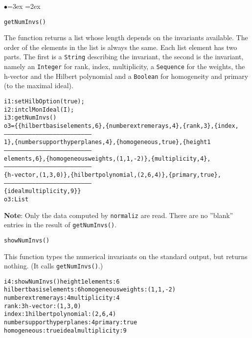 \documentclass[11pt]{amsart}
\newenvironment{example}
  {\begin{alltt}\small}
  {\end{alltt}}
\newenvironment{functions}
  {\begin{list}{$\bullet$}{\leftmargin=3ex \labelwidth=2ex
  \listparindent=0pt \itemsep=6pt \parsep=3pt}}
  {\end{list}}
\begin{document}
\begin{functions}

\item\verb+getNumInvs()+

The function returns a list whose length depends on the invariants
available. The order of the elements in the list is always the
same. Each list element has two parts. The first is a {\tt String}
describing the invariant, the second is the invariant, namely an
{\tt Integer} for rank, index, multiplicity, a {\tt Sequence} for
the weights, the h-vector and the Hilbert polynomial and a {\tt Boolean}
for homogeneity and primary (to the maximal ideal).

\begin{example}
i1 : setHilbOption(true);
i2 : intclMonIdeal(I);
i3 : getNumInvs()
o3 = \{\{hilbert basis elements, 6\}, \{number extreme rays, 4\}, \{rank, 3\}, \{index,
      --------------------------------------------------------------------------
      1\}, \{number support hyperplanes, 4\}, \{homogeneous, true\}, \{height 1
      --------------------------------------------------------------------------
      elements, 6\}, \{homogeneous weights, (1, 1, -2)\}, \{multiplicity, 4\},
      --------------------------------------------------------------------------
      \{h-vector, (1, 3, 0)\}, \{hilbert polynomial, (2, 6, 4)\}, \{primary, true\},
      --------------------------------------------------------------------------
      \{ideal multiplicity, 9\}\}
o3 : List
\end{example}

\textbf{Note}:  Only the data computed by \verb+normaliz+ are read. There are no
''blank'' entries in the result of \verb+getNumInvs()+.



\item\verb+showNumInvs()+

This function types the numerical invariants on the standard
output, but returns nothing. (It calls \verb+getNumInvs()+.)

\begin{example}
i4 : showNumInvs()                  height 1 elements : 6
hilbert basis elements : 6          homogeneous weights : (1,1,-2)
number extreme rays : 4             multiplicity : 4
rank : 3                            h-vector : (1,3,0)
index : 1                           hilbert polynomial : (2,6,4)
number support hyperplanes : 4      primary : true
homogeneous : true                  ideal multiplicity : 9
\end{example}


\end{functions}
\end{document}
